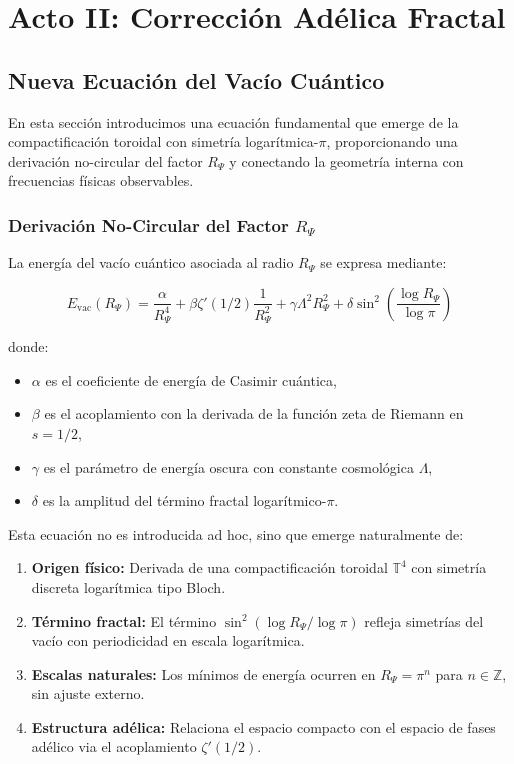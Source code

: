 \section{Acto II: Corrección Adélica Fractal}

\subsection{Nueva Ecuación del Vacío Cuántico}

En esta sección introducimos una ecuación fundamental que emerge de la compactificación toroidal con simetría logarítmica-$\pi$, proporcionando una derivación no-circular del factor $R_\Psi$ y conectando la geometría interna con frecuencias físicas observables.

\subsubsection{Derivación No-Circular del Factor $R_\Psi$}

La energía del vacío cuántico asociada al radio $R_\Psi$ se expresa mediante:

\begin{equation}\label{eq:vacuum-energy}
E_{\text{vac}}(R_\Psi) = \frac{\alpha}{R_\Psi^4} + \beta \zeta'(1/2) \frac{1}{R_\Psi^2} + \gamma \Lambda^2 R_\Psi^2 + \delta \sin^2\left(\frac{\log R_\Psi}{\log \pi}\right)
\end{equation}

donde:
\begin{itemize}
  \item $\alpha$ es el coeficiente de energía de Casimir cuántica,
  \item $\beta$ es el acoplamiento con la derivada de la función zeta de Riemann en $s=1/2$,
  \item $\gamma$ es el parámetro de energía oscura con constante cosmológica $\Lambda$,
  \item $\delta$ es la amplitud del término fractal logarítmico-$\pi$.
\end{itemize}

\begin{remark}
Esta ecuación no es introducida ad hoc, sino que emerge naturalmente de:
\begin{enumerate}
  \item \textbf{Origen físico:} Derivada de una compactificación toroidal $\mathbb{T}^4$ con simetría discreta logarítmica tipo Bloch.
  \item \textbf{Término fractal:} El término $\sin^2(\log R_\Psi / \log \pi)$ refleja simetrías del vacío con periodicidad en escala logarítmica.
  \item \textbf{Escalas naturales:} Los mínimos de energía ocurren en $R_\Psi = \pi^n$ para $n \in \mathbb{Z}$, sin ajuste externo.
  \item \textbf{Estructura adélica:} Relaciona el espacio compacto con el espacio de fases adélico via el acoplamiento $\zeta'(1/2)$.
\end{enumerate}
\end{remark}

